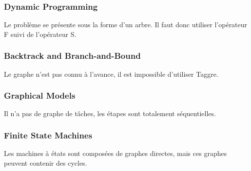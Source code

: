 \subsubsection{Dynamic Programming}
Le problème se présente sous la forme d'un arbre.
%
Il faut donc utiliser l'opérateur F suivi de l'opérateur S.


\subsubsection{Backtrack and Branch-and-Bound}
Le graphe n'est pas connu à l'avance, il est impossible d'utiliser Taggre.


\subsubsection{Graphical Models}
Il n'a pas de graphe de tâches, les étapes sont totalement séquentielles.


\subsubsection{Finite State Machines}
Les machines à états sont composées de graphes directes, mais ces graphes peuvent contenir des cycles.
